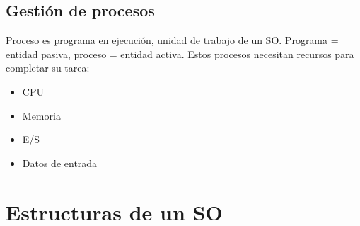 \documentclass{templateNote}
\begin{document}
\subsection*{Gestión de procesos}
Proceso es programa en ejecución, unidad de trabajo de un SO. Programa = entidad pasiva, proceso = entidad activa. Estos procesos necesitan recursos para completar su tarea:
\begin{itemize}
    \item CPU
    \item Memoria
    \item E/S
    \item Datos de entrada
\end{itemize}

\newpage
\section{Estructuras de un SO}
\end{document}
